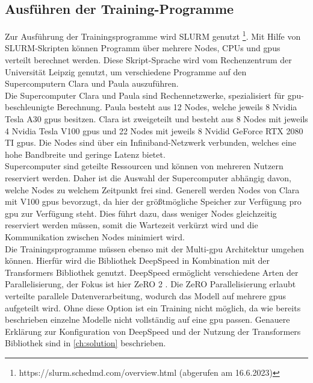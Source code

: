 \subsection{Ausführen der Training-Programme}

Zur Ausführung der Trainingsprogramme wird SLURM genutzt \footnote{https://slurm.schedmd.com/overview.html (abgerufen am 16.6.2023)}.
Mit Hilfe von SLURM-Skripten können Programm über mehrere Nodes, CPUs und \ac{gpu}s verteilt berechnet werden.
Diese Skript-Sprache wird vom Rechenzentrum der Universität Leipzig genutzt, um verschiedene Programme auf den Supercomputern Clara und Paula auszuführen.\\

Die Supercomputer Clara und Paula sind Rechennetzwerke, spezialisiert für \ac{gpu}-beschleunigte Berechnung.
Paula besteht aus 12 Nodes, welche jeweils 8 Nvidia Tesla A30 \ac{gpu}s besitzen.
Clara ist zweigeteilt und besteht aus 8 Nodes mit jeweils 4 Nvidia Tesla V100 \ac{gpu}s und 22 Nodes mit jeweils 8 Nvidid GeForce RTX 2080 TI \ac{gpu}s.
Die Nodes sind über ein Infiniband-Netzwerk verbunden, welches eine hohe Bandbreite und geringe Latenz bietet.\\

Supercomputer sind geteilte Ressourcen und können von mehreren Nutzern reserviert werden.
Daher ist die Auswahl der Supercomputer abhängig davon, welche Nodes zu welchem Zeitpunkt frei sind.
Generell werden Nodes von Clara mit V100 \ac{gpu}s bevorzugt, da hier der größtmögliche Speicher zur Verfügung pro \ac{gpu} zur Verfügung steht.
Dies führt dazu, dass weniger Nodes gleichzeitig reserviert werden müssen, somit die Wartezeit verkürzt wird und die Kommunikation zwischen Nodes minimiert wird.\\

Die Trainingsprogramme müssen ebenso mit der Multi-\ac{gpu} Architektur umgehen können.
Hierfür wird die Bibliothek DeepSpeed \citep{deepspeed} in Kombination mit der Transformers Bibliothek genutzt.
DeepSpeed ermöglicht verschiedene Arten der Parallelisierung, der Fokus ist hier ZeRO 2 \citep{ZeRO}.
Die ZeRO Parallelisierung erlaubt verteilte parallele Datenverarbeitung, wodurch das Modell auf mehrere \ac{gpu}s aufgeteilt wird.
Ohne diese Option ist ein Training nicht möglich, da wie bereits beschrieben einzelne Modelle nicht vollständig auf eine \ac{gpu} passen.
Genauere Erklärung zur Konfiguration von DeepSpeed und der Nutzung der Transformers Bibliothek sind in \ref{ch:solution} beschrieben.

